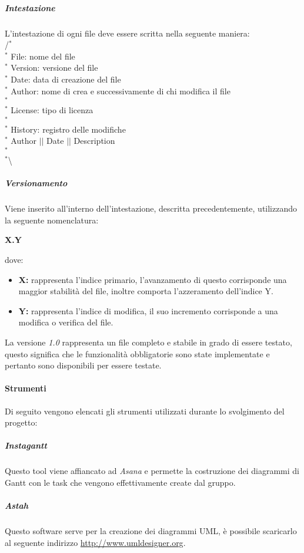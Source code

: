 \subparagraph{Intestazione}
L'intestazione di ogni file deve essere scritta nella seguente maniera: \\
/$^{*}$\\
$^{*}$ File: nome del file \\
$^{*}$ Version: versione del file \\
$^{*}$ Date: data di creazione del file \\
$^{*}$ Author: nome di crea e successivamente di chi modifica il file \\
$^{*}$ \\
$^{*}$ License: tipo di licenza \\
$^{*}$ \\
$^{*}$ History: registro delle modifiche \\
$^{*}$ Author $\vert$$\vert$ Date $\vert$$\vert$ Description \\
$^{*}$ \\
$^{*}$\textbackslash

\subparagraph{Versionamento}
Viene inserito all'interno dell'intestazione, descritta precedentemente, utilizzando la seguente nomenclatura:
\begin{center}
	\textbf{X.Y}
\end{center}
dove:
\begin{itemize}
	\item \textbf{X:} rappresenta l'indice primario, l'avanzamento di questo corrisponde una maggior stabilità del file, inoltre comporta l'azzeramento dell'indice Y.
	\item \textbf{Y:} rappresenta l'indice di modifica, il suo incremento corrisponde a una modifica o verifica del file. 
\end{itemize}
La versione \textit{1.0} rappresenta un file completo e stabile in grado di essere testato, questo significa che le funzionalità obbligatorie sono state implementate e pertanto sono disponibili per essere testate.

\paragraph{Strumenti}
Di seguito vengono elencati gli strumenti utilizzati durante lo svolgimento del progetto:

\subparagraph{Instagantt}
Questo tool viene affiancato ad \textit{Asana} e permette la costruzione dei diagrammi di Gantt con le task che vengono effettivamente create dal gruppo.
\subparagraph{Astah}
Questo software serve per la creazione dei diagrammi UML, è possibile scaricarlo al seguente indirizzo \url{http://www.umldesigner.org}.



